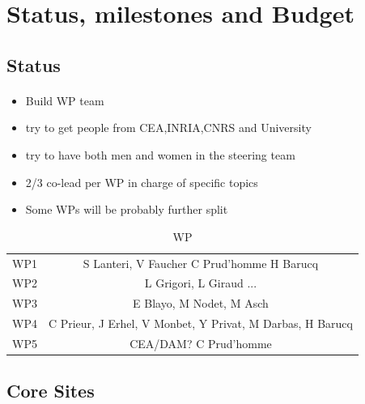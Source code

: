 \section{Status, milestones and Budget}

\subsection{Status}

\begin{frame}[fragile=singleslide]{\insertsectionhead}
  \framesubtitle{\insertsubsectionhead}
  \begin{itemize}
      \item Build WP team
      \item try to get people from CEA,INRIA,CNRS and University
      \item try to have both men and women in the steering team
      \item 2/3 co-lead per WP in charge of specific topics
      \item Some WPs will be probably further split
  \end{itemize}
  \begin{table}[]
      \centering
      \begin{tabular}{c|c}
          WP1 &  S Lanteri, V Faucher C Prud'homme H Barucq\\
          WP2&  L Grigori, L Giraud ...\\
          WP3& E Blayo, M Nodet, M Asch \\
          WP4& C Prieur, J Erhel, V Monbet, Y Privat, M Darbas, H Barucq \\
          WP5 & CEA/DAM? C Prud'homme
      \end{tabular}
      \caption{WP}
      \label{tab:my_label}
  \end{table}

\end{frame}

\subsection{Core Sites}

